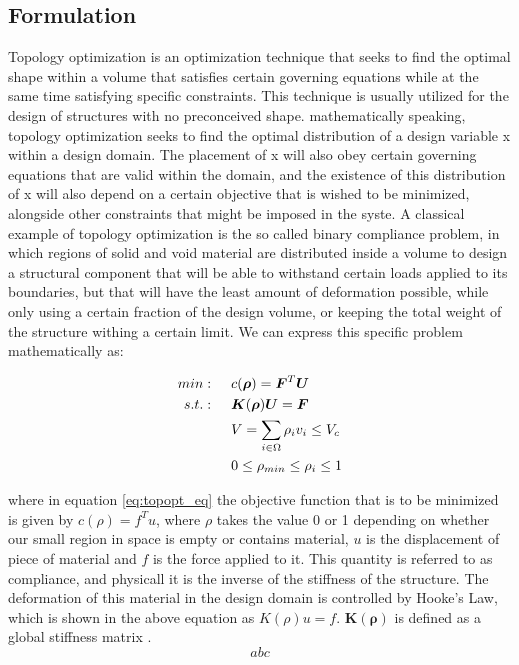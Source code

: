 \documentclass[../main.tex]{subfiles}
\begin{document}
\subsection{Formulation}
Topology optimization is an optimization technique that seeks to find the optimal shape within a volume that satisfies certain governing equations while at the same time satisfying specific constraints. This technique is usually utilized for the design of structures with no preconceived shape. mathematically speaking, topology optimization seeks to find the optimal distribution of a design variable x within a design domain. The placement of x will also obey certain governing equations that are valid within the domain, and the existence of this distribution of x will also depend on a certain objective that is wished to be minimized, alongside other constraints that might be imposed in the syste. A classical example of topology optimization is the so called binary compliance problem, in which regions of solid and void material are distributed inside a volume to design a structural component that will be able to withstand certain loads applied to its boundaries, but that will have the least amount of deformation possible, while only using a certain fraction of the design volume, or keeping the total weight of the structure withing a certain limit. We can express this specific problem mathematically as:

\begin{align} 
  min: & \hspace{0.5cm} c(\bm{\rho}) = \bm{F}^T \bm{U}  \\
  s.t.: & \hspace{0.5cm} \bm{K}(\bm{\rho})\bm{U} = \bm{F}  \\
        & \hspace{0.5cm} V = \sum _{i \in \Omega} \rho_i v_i \leq V_c \\ 
        & \hspace{0.5cm} 0 \leq \rho_{min} \leq \rho_i \leq 1
\end{align}
\label{eq:topopt_eq}

where in equation \ref{eq:topopt_eq} the objective function that is to be minimized is given by $c(\rho) = f^T u$, where $\rho$ takes the value 0 or 1 depending on whether our small region in space is empty or contains material, $u$ is the displacement of piece of material and $f$ is the force applied to it. This quantity is referred to as compliance, and physicall it is the inverse of the stiffness of the structure. The deformation of this material in the design domain is controlled by Hooke's Law, which is shown in the above equation as $K(\rho) u = f$. $\bm{K}(\bm{\rho})$ is defined as a global stiffness matrix \cite{hornbergerFiniteElementMethod2005}.
\begin{equation}
  abc
  \label{eq:stiffness}
\end{equation}
\end{document}
